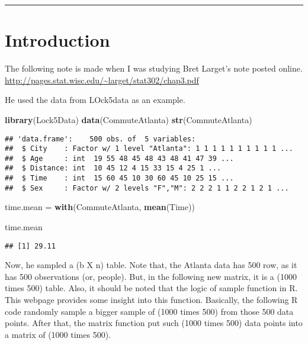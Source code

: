 \documentclass[]{book}
\newenvironment{Shaded}{\begin{snugshade}}{\end{snugshade}}
\newcommand{\KeywordTok}[1]{\textcolor[rgb]{0.13,0.29,0.53}{\textbf{#1}}}
\newcommand{\NormalTok}[1]{#1}
\newcommand{\StringTok}[1]{\textcolor[rgb]{0.31,0.60,0.02}{#1}}
\begin{document}
\begin{center}\rule{0.5\linewidth}{\linethickness}\end{center}

\hypertarget{introduction}{%
\section{Introduction}\label{introduction}}

The following note is made when I was studying Bret Larget's note posted online.
\url{http://pages.stat.wisc.edu/~larget/stat302/chap3.pdf}

He used the data from LOck5data as an example.

\begin{Shaded}
\begin{Highlighting}[]
\KeywordTok{library}\NormalTok{(Lock5Data)}
\KeywordTok{data}\NormalTok{(CommuteAtlanta)}
\KeywordTok{str}\NormalTok{(CommuteAtlanta)}
\end{Highlighting}
\end{Shaded}

\begin{verbatim}
## 'data.frame':    500 obs. of  5 variables:
##  $ City    : Factor w/ 1 level "Atlanta": 1 1 1 1 1 1 1 1 1 1 ...
##  $ Age     : int  19 55 48 45 48 43 48 41 47 39 ...
##  $ Distance: int  10 45 12 4 15 33 15 4 25 1 ...
##  $ Time    : int  15 60 45 10 30 60 45 10 25 15 ...
##  $ Sex     : Factor w/ 2 levels "F","M": 2 2 2 1 1 2 2 1 2 1 ...
\end{verbatim}

\begin{Shaded}
\begin{Highlighting}[]
\NormalTok{time.mean =}\StringTok{ }\KeywordTok{with}\NormalTok{(CommuteAtlanta, }\KeywordTok{mean}\NormalTok{(Time))}

\NormalTok{time.mean}
\end{Highlighting}
\end{Shaded}

\begin{verbatim}
## [1] 29.11
\end{verbatim}

Now, he sampled a (b X n) table. Note that, the Atlanta data has 500 row, as it has 500 observations (or, people). But, in the following new matrix, it is a (1000 times 500) table. Also, it should be noted that the logic of sample function in R. This webpage provides some insight into this function. Basically, the following R code randomly sample a bigger sample of (1000 times 500) from those 500 data points. After that, the matrix function put such (1000 times 500) data points into a matrix of (1000 times 500).
\end{document}
